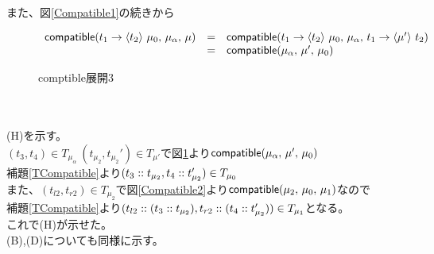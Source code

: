 \\
また、図\ref{Compatible1}の続きから\\
\begin{figure}[h]
\[
\begin{array}{lcl}
  \Compatible{\Trail{t_1}{\mu_0}{t_2}}{\mu_{\alpha}}{\mu} &=& \Compatible{\Trail{t_1}{\mu_0}{t_2}}{\mu_{\alpha}}{\Trail{t_1}{t_2}{\mu'}}\\
  &=& \Compatible{\mu_{\alpha}}{\mu'}{\mu_0}
\end{array}
\]
\caption{\textsf{comptible}展開3}
\label{Compatible3}
\end{figure}\\
\\
(H)を示す。\\
$(t_3,t_4)\in T_{\mu_{\alpha}}\ (t_{\mu_2},t_{\mu_2}')\in T_{\mu'}$で図\ref{Compatible3}より$\Compatible{\mu_{\alpha}}{\mu'}{\mu_0}$\\
補題\ref{TCompatible}より$(\Cons{t_3}{t_{\mu_2}},\Cons{t_4}{t_{\mu_2}'})\in T_{\mu_0}$\\
また、$(t_{l2},t_{r2})\in T_{\mu_2}$で図\ref{Compatible2}より$\Compatible{\mu_2}{\mu_0}{\mu_1}$なので\\
補題\ref{TCompatible}より$(\Cons{t_{l2}}{\ConsP{t_3}{t_{\mu_2}}},\Cons{t_{r2}}{\ConsP{t_4}{t_{\mu_2}'}})\in T_{\mu_1}$となる。\\
これで(H)が示せた。\\
(B),(D)についても同様に示す。\\



